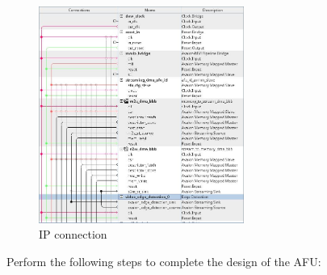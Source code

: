 \documentclass[epsfig,10pt,fullpage]{article}
\begin{document}
\begin{figure}[h]
    \centering
    \includegraphics[width=0.6\textwidth]{figures/ip_connection.JPG}
    \caption{IP connection}
    \label{fig:ip_connect}
\end{figure}
Perform the following steps to complete the design of the AFU:
\end{document}
